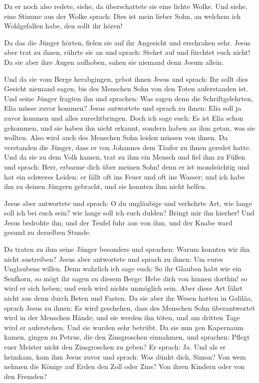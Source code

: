  Da er noch also redete, siehe, da überschattete sie eine
lichte Wolke. Und siehe, eine Stimme aus der Wolke sprach: Dies ist mein
lieber Sohn, an welchem ich Wohlgefallen habe, den sollt ihr hören!

 Da das die Jünger hörten, fielen sie auf ihr Angesicht
und erschraken sehr.  Jesus aber trat zu ihnen, rührte sie
an und sprach: Stehet auf und fürchtet euch nicht!  Da sie
aber ihre Augen aufhoben, sahen sie niemand denn Jesum allein.

 Und da sie vom Berge herabgingen, gebot ihnen Jesus und
sprach: Ihr sollt dies Gesicht niemand sagen, bis des Menschen Sohn von
den Toten auferstanden ist.  Und seine Jünger fragten ihn
und sprachen: Was sagen denn die Schriftgelehrten, Elia müsse zuvor
kommen?  Jesus antwortete und sprach zu ihnen: Elia soll
ja zuvor kommen und alles zurechtbringen.  Doch ich sage
euch: Es ist Elia schon gekommen, und sie haben ihn nicht erkannt,
sondern haben an ihm getan, was sie wollten. Also wird auch des Menschen
Sohn leiden müssen von ihnen.  Da verstanden die Jünger,
dass er von Johannes dem Täufer zu ihnen geredet hatte. 
Und da sie zu dem Volk kamen, trat zu ihm ein Mensch und fiel ihm zu
Füßen  und sprach: Herr, erbarme dich über meinen Sohn!
denn er ist mondsüchtig und hat ein schweres Leiden: er fällt oft ins
Feuer und oft ins Wasser;  und ich habe ihn zu deinen
Jüngern gebracht, und sie konnten ihm nicht helfen.

 Jesus aber antwortete und sprach: O du ungläubige und
verkehrte Art, wie lange soll ich bei euch sein? wie lange soll ich euch
dulden? Bringt mir ihn hierher!  Und Jesus bedrohte ihn;
und der Teufel fuhr aus von ihm, und der Knabe ward gesund zu derselben
Stunde.

 Da traten zu ihm seine Jünger besonders und sprachen:
Warum konnten wir ihn nicht austreiben?  Jesus aber
antwortete und sprach zu ihnen: Um eures Unglaubens willen. Denn
wahrlich ich sage euch: So ihr Glauben habt wie ein Senfkorn, so mögt
ihr sagen zu diesem Berge: Hebe dich von hinnen dorthin! so wird er sich
heben; und euch wird nichts unmöglich sein.  Aber diese
Art fährt nicht aus denn durch Beten und Fasten.  Da sie
aber ihr Wesen hatten in Galiläa, sprach Jesus zu ihnen: Es wird
geschehen, dass des Menschen Sohn überantwortet wird in der Menschen
Hände;  und sie werden ihn töten, und am dritten Tage
wird er auferstehen. Und sie wurden sehr betrübt.  Da sie
nun gen Kapernaum kamen, gingen zu Petrus, die den Zinsgroschen
einnahmen, und sprachen: Pflegt euer Meister nicht den Zinsgroschen zu
geben?  Er sprach: Ja. Und als er heimkam, kam ihm Jesus
zuvor und sprach: Was dünkt dich, Simon? Von wem nehmen die Könige auf
Erden den Zoll oder Zins? Von ihren Kindern oder von den Fremden?

